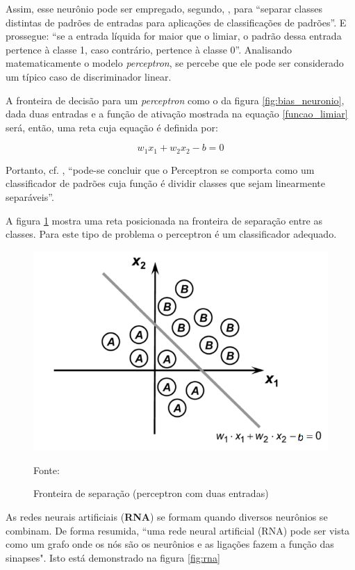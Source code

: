 Assim, esse neurônio pode ser empregado, segundo, \cite[p. 58]{lima_ia_2016}, para ``separar classes distintas de padrões de entradas para aplicações de classificações de padrões''. E prossegue: ``se a entrada líquida for maior que o limiar, o padrão dessa entrada pertence à classe 1, caso contrário, pertence à classe 0''. Analisando matematicamente o modelo \textit{perceptron}, se percebe que ele pode ser considerado um típico caso de discriminador linear. 

A fronteira de decisão para um \textit{perceptron} como o da figura \ref{fig:bias_neuronio}, dada duas entradas e a função de ativação mostrada na equação \ref{funcao_limiar} será, então, uma reta cuja equação é definida por: 

\begin{equation}\label{eq_reta}
	w_1x_1 + w_2x_2 - b = 0
\end{equation}

Portanto, cf. \cite{silva_redes_2016}, ``pode-se concluir que o Perceptron se comporta como um classificador de padrões cuja função é dividir classes que sejam linearmente separáveis''.

A figura \ref{fig:linearmente_separavel} mostra uma reta posicionada na fronteira de separação entre as classes. Para este tipo de problema o perceptron é um classificador adequado.

\begin{figure}[h!]
	\centering
	\includegraphics[width=.7\textwidth]{imagens/linearmente_separavel.png}	
	\caption{Fronteira de separação (perceptron com duas entradas)}
	{\scriptsize 	Fonte: \cite[p. 62]{silva_redes_2016}}
	\label{fig:linearmente_separavel}
\end{figure}

As redes neurais artificiais (\textbf{RNA}) se formam quando diversos neurônios se combinam. De forma resumida, ``uma rede neural artificial (RNA) pode ser vista como um grafo onde os nós são os neurônios e as ligações fazem a função das sinapses". Isto está demonstrado na figura \ref{fig:rna}

